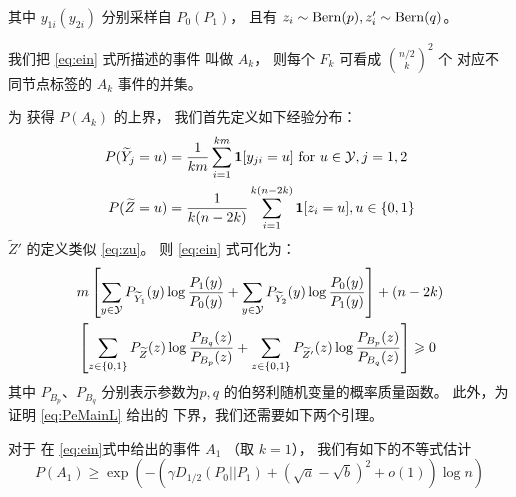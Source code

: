     其中 $y_{1i}(y_{2i})$ 分别采样自
    $P_0(P_1)$，
    且有 $z_{i} \sim \Bern(p), z'_{i} \sim \Bern(q)$。
    
    我们把 \eqref{eq:ein} 式所描述的事件
    叫做 $A_k$，
    则每个 $F_k$ 
    可看成
     $\binom{n/2}{k}^2$ 个
    对应不同节点标签的
    $A_k$ 事件的并集。
    
    为
    获得 $P(A_k)$
    的上界， 
    我们首先定义如下经验分布：
    \begin{align}
    P(\widetilde{Y}_j = u) &=
    \frac{1}{km} \sum_{i=1}^{km}
    \mathbf{1}[y_{ji} = u] \textrm{ for } u \in \mathcal{Y}, j=1,2 
    \notag \\
    P(\widetilde{Z} = u) &= \frac{1}{k(n-2k)}\sum_{i=1}^{k(n-2k)} \mathbf{1}[z_i = u], u \in \{0, 1\}
    \label{eq:zu}
    \end{align}
     $\widetilde{Z}'$ 
     的定义类似 \eqref{eq:zu}。
 则
    \eqref{eq:ein} 式可化为：
    \begin{align}
    &m\left[\sum_{y\in \mathcal{Y}}
    P_{\widetilde{Y}_1}(y)\log\frac{P_1(y)}
    {P_0(y)}
    +\sum_{y\in \mathcal{Y}}
    P_{\widetilde{Y}_2}(y)\log\frac{P_0(y)}
    {P_1(y)}
    \right] +(n-2k)\notag \\
    &\left[\sum_{z\in\{0,1\}}
    P_{\widetilde{Z}}(z) \log \frac{P_{B_q}(z)}
    {P_{B_p}(z)}
    + \sum_{z\in\{0,1\}} 
    P_{\widetilde{Z}'}(z) \log \frac{P_{B_p}(z)}
    {P_{B_q}(z)}\right] \geq 0 \label{eq:mnk}
    \end{align}
    其中 $P_{B_p}$、$P_{B_q}$ 分别表示参数为$p,q$
    的伯努利随机变量的概率质量函数。
    此外，为证明 \eqref{eq:PeMainL} 给出的
    下界，我们还需要如下两个引理。
    \begin{lemma}\label{lem:single_lower}
        对于 
         在 \eqref{eq:ein}式中给出的事件 $A_1$ 
          （取 $k=1$），
        我们有如下的不等式估计
        \begin{equation}\label{eq:pa1}
        P(A_1) \geq \exp(-(\gamma D_{1/2}(P_0||P_1) + (\sqrt{a}-\sqrt{b})^2 + o(1))\log n )
        \end{equation}
        \end{lemma}
